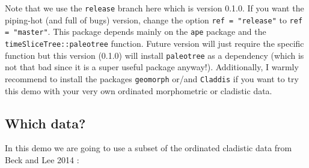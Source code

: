 \documentclass{article}\usepackage[]{graphicx}\usepackage[]{color}
\begin{document}
Note that we use the \texttt{release} branch here which is version 0.1.0.
If you want the piping-hot (and full of bugs) version, change the option \texttt{ref = "release"} to \texttt{ref = "master"}.
This package depends mainly on the \texttt{ape} package and the \texttt{timeSliceTree::paleotree} function.
Future version will just require the specific function but this version (0.1.0) will install \texttt{paleotree} as a dependency (which is not that bad since it is a super useful package anyway!).
Additionally, I warmly recommend to install the packages \texttt{geomorph} or/and \texttt{Claddis} if you want to try this demo with your very own ordinated morphometric or cladistic data.

\subsection{Which data?}
In this demo we are going to use a subset of the ordinated cladistic data from Beck and Lee 2014 \cite{beckancient2014}:
\end{document}
